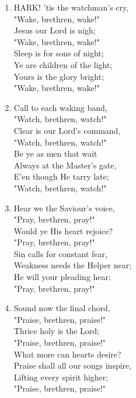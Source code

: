 \documentclass[11pt,a4paper]{article}
\begin{document}
\begin{enumerate}
    \item HARK! 'tis the watchman's cry, \\
        "Wake, brethren, wake!" \\
        Jesus our Lord is nigh; \\
        "Wake, brethren, wake!" \\
        Sleep is for sons of night; \\
        Ye are children of the light; \\
        Yours is the glory bright; \\
        "Wake, brethren, wake!"

    \item Call to each waking band, \\
        "Watch, brethren, watch!" \\
        Clear is our Lord's command, \\
        "Watch, brethren, watch!" \\
        Be ye as men that wait \\
        Always at the Master's gate, \\
        E'en though He tarry late; \\
        "Watch, brethren, watch!"

    \item Hear we the Saviour's voice, \\
        "Pray, brethren, pray!" \\
        Would ye His heart rejoice? \\
        "Pray, brethren, pray!" \\
        Sin calls for constant fear, \\
        Weakness needs the Helper near; \\
        He will your pleading hear; \\
        "Pray, brethren, pray!"

    \item Sound now the final chord, \\
        "Praise, brethren, praise!" \\
        Thrice holy is the Lord; \\
        "Praise, brethren, praise!" \\
        What more can hearts desire? \\
        Praise shall all our songs inspire, \\
        Lifting every spirit higher; \\
        "Praise, brethren, praise!"


\end{enumerate}
\end{document}
